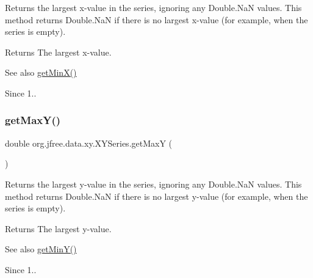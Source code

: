 Returns the largest x-\/value in the series, ignoring any Double.\+NaN values. This method returns Double.\+NaN if there is no largest x-\/value (for example, when the series is empty).

\begin{DoxyReturn}{Returns}
The largest x-\/value.
\end{DoxyReturn}
\begin{DoxySeeAlso}{See also}
\mbox{\hyperlink{classorg_1_1jfree_1_1data_1_1xy_1_1_x_y_series_a5d9d477f95bd6b6d3e0662f26eb58447}{get\+Min\+X()}}
\end{DoxySeeAlso}
\begin{DoxySince}{Since}
1.. 
\end{DoxySince}
\mbox{\label{classorg_1_1jfree_1_1data_1_1xy_1_1_x_y_series_a2e78207e795f8be478094042858c1bb0}} 
\subsubsection{\texorpdfstring{get\+Max\+Y()}{getMaxY()}}
{\footnotesize\ttfamily double org.\+jfree.\+data.\+xy.\+X\+Y\+Series.\+get\+MaxY (\begin{DoxyParamCaption}{ }\end{DoxyParamCaption})}

Returns the largest y-\/value in the series, ignoring any Double.\+NaN values. This method returns Double.\+NaN if there is no largest y-\/value (for example, when the series is empty).

\begin{DoxyReturn}{Returns}
The largest y-\/value.
\end{DoxyReturn}
\begin{DoxySeeAlso}{See also}
\mbox{\hyperlink{classorg_1_1jfree_1_1data_1_1xy_1_1_x_y_series_a4d5a819937e869b22195efc457ba6da7}{get\+Min\+Y()}}
\end{DoxySeeAlso}
\begin{DoxySince}{Since}
1.. 
\end{DoxySince}
\mbox{\label{classorg_1_1jfree_1_1data_1_1xy_1_1_x_y_series_a5d9d477f95bd6b6d3e0662f26eb58447}} 
